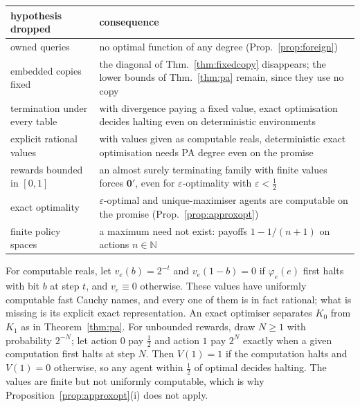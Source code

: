 \begin{table}[htbp]
  \centering\small
  \renewcommand{\arraystretch}{1.2}
  \label{tab:sharpness}
  \begin{tabularx}{\textwidth}{@{}>{\raggedright\arraybackslash}p{9.6em}
                                    >{\raggedright\arraybackslash}X@{}}
    \toprule
    hypothesis dropped & consequence \\
    \midrule
    owned queries & no optimal function of any degree (Prop.~\ref{prop:foreign}) \\
    embedded copies fixed & the diagonal of Thm.~\ref{thm:fixedcopy} disappears; the lower bounds of
                            Thm.~\ref{thm:pa} remain, since they use no copy \\
    termination under every table & with divergence paying a fixed value, exact optimisation decides
                                    halting even on deterministic environments \\
    explicit rational values & with values given as computable reals, deterministic exact
                               optimisation needs PA degree even on the promise \\
    rewards bounded in $[0,1]$ & an almost surely terminating family with finite values forces
                                 $\mathbf 0'$, even for $\varepsilon$-optimality with $\varepsilon<\tfrac12$ \\
    exact optimality & $\varepsilon$-optimal and unique-maximiser agents are computable on the
                       promise (Prop.~\ref{prop:approxopt}) \\
    finite policy spaces & a maximum need not exist: payoffs $1-1/(n+1)$ on actions $n\in\mathbb N$ \\
    \bottomrule
  \end{tabularx}
\end{table}

For computable reals, let $v_e(b)=2^{-t}$ and $v_e(1-b)=0$ if $\varphi_e(e)$ first halts with bit $b$
at step $t$, and $v_e\equiv0$ otherwise. These values have uniformly computable fast Cauchy names, and
every one of them is in fact rational; what is missing is its explicit exact representation. An exact
optimiser separates $K_0$ from $K_1$ as in Theorem~\ref{thm:pa}. For unbounded rewards, draw $N\ge1$
with probability $2^{-N}$; let action $0$ pay $\tfrac12$ and action $1$ pay $2^N$ exactly when a given
computation first halts at step $N$. Then $V(1)=1$ if the computation halts and $V(1)=0$ otherwise, so
any agent within $\tfrac12$ of optimal decides halting. The values are finite but not uniformly
computable, which is why Proposition~\ref{prop:approxopt}(i) does not apply.

